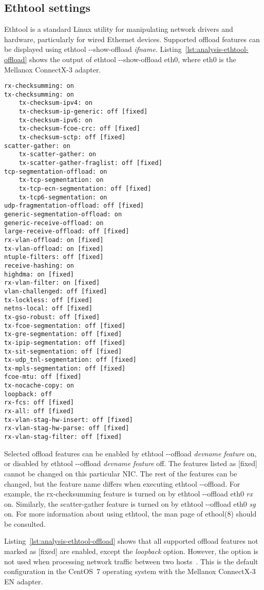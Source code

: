 
\subsection{Ethtool settings}\label{sub:analysis-settings-ethtool}
Ethtool is a standard Linux utility for manipulating network drivers and hardware, particularly for
wired Ethernet devices.
Supported offload features can be displayed using ethtool -{}-show-offload {\it{ifname}}.
Listing~\ref{lst:analysis-ethtool-offload} shows the output of ethtool -{}-show-offload eth0,
where eth0 is the Mellanox ConnectX-3 adapter.

\begin{lstlisting}[caption={Output of ethtool -{}-show-offload for Mellanox ConnectX3 adapter},label={lst:analysis-ethtool-offload}]
rx-checksumming: on
tx-checksumming: on
	tx-checksum-ipv4: on
	tx-checksum-ip-generic: off [fixed]
	tx-checksum-ipv6: on
	tx-checksum-fcoe-crc: off [fixed]
	tx-checksum-sctp: off [fixed]
scatter-gather: on
	tx-scatter-gather: on
	tx-scatter-gather-fraglist: off [fixed]
tcp-segmentation-offload: on
	tx-tcp-segmentation: on
	tx-tcp-ecn-segmentation: off [fixed]
	tx-tcp6-segmentation: on
udp-fragmentation-offload: off [fixed]
generic-segmentation-offload: on
generic-receive-offload: on
large-receive-offload: off [fixed]
rx-vlan-offload: on [fixed]
tx-vlan-offload: on [fixed]
ntuple-filters: off [fixed]
receive-hashing: on
highdma: on [fixed]
rx-vlan-filter: on [fixed]
vlan-challenged: off [fixed]
tx-lockless: off [fixed]
netns-local: off [fixed]
tx-gso-robust: off [fixed]
tx-fcoe-segmentation: off [fixed]
tx-gre-segmentation: off [fixed]
tx-ipip-segmentation: off [fixed]
tx-sit-segmentation: off [fixed]
tx-udp_tnl-segmentation: off [fixed]
tx-mpls-segmentation: off [fixed]
fcoe-mtu: off [fixed]
tx-nocache-copy: on
loopback: off
rx-fcs: off [fixed]
rx-all: off [fixed]
tx-vlan-stag-hw-insert: off [fixed]
rx-vlan-stag-hw-parse: off [fixed]
rx-vlan-stag-filter: off [fixed]
\end{lstlisting}

Selected offload features can be enabled by ethtool -{}-offload {\it{devname}} {\it{feature}} on,
or disabled by ethtool -{}-offload {\it{devname}} {\it{feature}} off.
The features listed as [fixed] cannot be changed on this particular NIC.
The rest of the features can be changed, but the feature name differs when executing ethtool -{}-offload.
For example, the rx-checksumming feature is turned on by ethtool -{}-offload eth0 {\it{rx}} on.
Similarly, the scatter-gather feature is turned on by ethtool -{}-offload eth0 {\it{sg}} on.
For more information about using ethtool, the man page of ethool(8) should be consulted.

Listing~\ref{lst:analysis-ethtool-offload} shows that all supported offload features not marked as [fixed] are enabled,
except the {\it{loopback}} option.
However, the option is not used when processing network traffic between two hosts~\cite{kernel-source}.
This is the default configuration in the CentOS~7 operating system with the Mellanox ConnectX-3 EN adapter.
